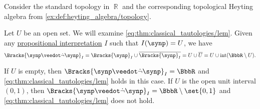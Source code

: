 \begin{example}\label{ex:topological_semantics_lem_counterexample}
  Consider the standard topology in \( \BbbR \) and the corresponding topological Heyting algebra from \cref{ex:def:heyting_algebra/topology}.

  Let \( U \) be an open set. We will examine \eqref{eq:thm:classical_tautologies/lem}. Given any \hyperref[def:propositional_valuation]{propositional interpretation} \( I \) such that \( I(\synp) = U \), we have
  \begin{equation*}
    \Bracks{\synp \synvee \synneg \synp}_I
    =
    \Bracks{\synp}_I \cup \oline{\Bracks{\synp}_I}
    =
    U \cup \oline{U}
    =
    U \cup \Int(\BbbR \setminus U).
  \end{equation*}

  If \( U \) is empty, then \( \Bracks{\synp \synvee \synneg \synp}_I = \BbbR \) and \eqref{eq:thm:classical_tautologies/lem} holds in this case. If \( U \) is the open unit interval \( (0, 1) \), then \( \Bracks{\synp \synvee \synneg \synp}_I = \BbbR \setminus \set{ 0, 1 } \) and \eqref{eq:thm:classical_tautologies/lem} does not hold.
\end{example}

